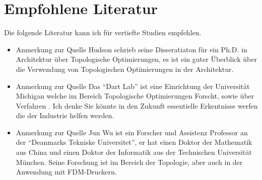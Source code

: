 \documentclass{article}
\begin{document}
\section{Empfohlene Literatur}
Die folgende Literatur kann ich für vertiefte Studien empfehlen.
\begin{itemize}
    \item {}
        \begin{ff}{Anmerkung zur Quelle}
            Hudson schrieb seine Disseratiaton f\"ur ein Ph.D. in Architektur
            \"uber Topologische Optimierungen, es ist ein guter \"Uberblick \"uber die
            Verwendung von Topologischen Optimierungen in der Architektur.
        \end{ff}
    \item {}
        \begin{ff}{Anmerkung zur Quelle}
            Das ``Dart Lab'' ist eine Einrichtung der Universit\"at Michigan welche im 
            Bereich Topologische Optimierungen Forscht, sowie \"uber Verfahren %
            . Ich denke Sie k\"onnte in den Zukunft essentielle Erkentnisse werfen die der 
            Industrie helfen werden.
        \end{ff}
    \item {}
        \begin{ff}{Anmerkung zur Quelle}
            Jun Wu ist ein Forscher und Assistenz Professor an der ``Deanmarks
            Tekniske Universitet'', er hat einen Doktor der Mathematik aus
            China und einen Doktor der Informatik aus der Technischen
            Universit\"at M\"unchen. Seine Forschung ist im Bereich der
            Topologie, aber auch in der Anwendung mit FDM-Druckern.
        \end{ff}
\end{itemize}


\newpage
\printbibliography
\end{document}
